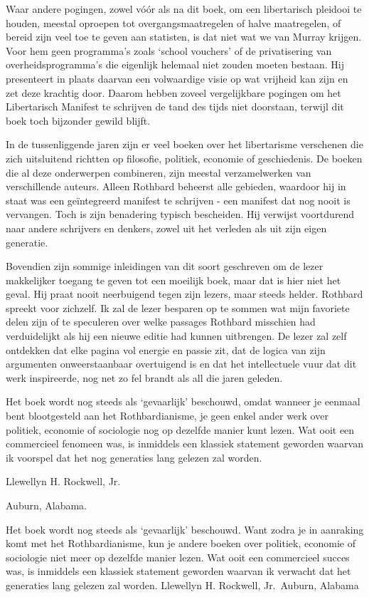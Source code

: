 \documentclass[
  a5paper,
  smalldemyvopaper,10pt,twoside,onecolumn,openright,extrafontsizes,hidelinks]{memoir}
\begin{document}
Waar andere pogingen, zowel vóór als na dit boek, om een libertarisch
pleidooi te houden, meestal oproepen tot overgangsmaatregelen of halve
maatregelen, of bereid zijn veel toe te geven aan statisten, is dat niet
wat we van Murray krijgen. Voor hem geen programma's zoals `school
vouchers' of de privatisering van overheidsprogramma's die eigenlijk
helemaal niet zouden moeten bestaan. Hij presenteert in plaats daarvan
een volwaardige visie op wat vrijheid kan zijn en zet deze krachtig
door. Daarom hebben zoveel vergelijkbare pogingen om het Libertarisch
Manifest te schrijven de tand des tijds niet doorstaan, terwijl dit boek
toch bijzonder gewild blijft.

In de tussenliggende jaren zijn er veel boeken over het libertarisme
verschenen die zich uitsluitend richtten op filosofie, politiek,
economie of geschiedenis. De boeken die al deze onderwerpen combineren,
zijn meestal verzamelwerken van verschillende auteurs. Alleen Rothbard
beheerst alle gebieden, waardoor hij in staat was een geïntegreerd
manifest te schrijven - een manifest dat nog nooit is vervangen. Toch is
zijn benadering typisch bescheiden. Hij verwijst voortdurend naar andere
schrijvers en denkers, zowel uit het verleden als uit zijn eigen
generatie.

Bovendien zijn sommige inleidingen van dit soort geschreven om de lezer
makkelijker toegang te geven tot een moeilijk boek, maar dat is hier
niet het geval. Hij praat nooit neerbuigend tegen zijn lezers, maar
steeds helder. Rothbard spreekt voor zichzelf. Ik zal de lezer besparen
op te sommen wat mijn favoriete delen zijn of te speculeren over welke
passages Rothbard misschien had verduidelijkt als hij een nieuwe editie
had kunnen uitbrengen. De lezer zal zelf ontdekken dat elke pagina vol
energie en passie zit, dat de logica van zijn argumenten onweerstaanbaar
overtuigend is en dat het intellectuele vuur dat dit werk inspireerde,
nog net zo fel brandt als all die jaren geleden.

Het boek wordt nog steeds als `gevaarlijk' beschouwd, omdat wanneer je
eenmaal bent blootgesteld aan het Rothbardianisme, je geen enkel ander
werk over politiek, economie of sociologie nog op dezelfde manier kunt
lezen. Wat ooit een commercieel fenomeen was, is inmiddels een klassiek
statement geworden waarvan ik voorspel dat het nog generaties lang
gelezen zal worden.

Llewellyn H. Rockwell, Jr.

Auburn, Alabama.

Het boek wordt nog steeds als `gevaarlijk' beschouwd. Want zodra je in
aanraking komt met het Rothbardianisme, kun je andere boeken over
politiek, economie of sociologie niet meer op dezelfde manier lezen. Wat
ooit een commercieel succes was, is inmiddels een klassiek statement
geworden waarvan ik verwacht dat het generaties lang gelezen zal worden.
Llewellyn H. Rockwell, Jr.~Auburn, Alabama
\end{document}
